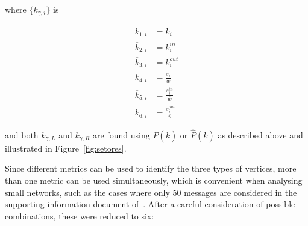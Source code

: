 \noindent where $\{\overline{k}_{\gamma,i}\}$ is

\begin{equation}
\begin{split}
\overline{k}_{1,i}&=k_i \\
\overline{k}_{2,i}&=k_i^{in} \\
\overline{k}_{3,i}&=k_i^{out} \\
\overline{k}_{4,i}&=\frac{s_i}{\overline{w}} \\
\overline{k}_{5,i}&=\frac{s_i^{in}}{\overline{w}} \\
\overline{k}_{6,i}&=\frac{s_i^{out}}{\overline{w}}
\end{split}
\end{equation}

\noindent and both $\overline{k}_{\gamma,L}$ and $\overline{k}_{\gamma,R}$ are found using $P(\overline{k})$ or $\hat{P}(\overline{k})$ as described above and illustrated in Figure~\ref{fig:setores}.

Since different metrics can be used to identify the three types of vertices, more than one metric can be used simultaneously, which is convenient when analysing small networks,
such as the cases where only 50 messages are considered in the supporting information document of~\cite{stab}.
After a careful consideration of possible combinations, these were reduced to six:

